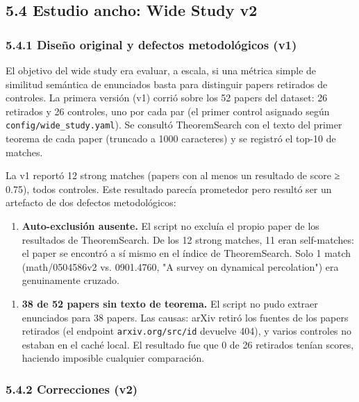 \documentclass[12pt,a4paper]{article}
\theoremstyle{remark}
\begin{document}
\subsection{5.4 Estudio ancho: Wide Study v2}

\subsubsection{5.4.1 Diseño original y defectos metodológicos (v1)}

El objetivo del wide study era evaluar, a escala, si una métrica simple de similitud semántica de enunciados basta para distinguir papers retirados de controles. La primera versión (v1) corrió sobre los 52 papers del dataset: 26 retirados y 26 controles, uno por cada par (el primer control asignado según \texttt{config/wide\_study.yaml}). Se consultó TheoremSearch con el texto del primer teorema de cada paper (truncado a 1000 caracteres) y se registró el top-10 de matches.


La v1 reportó 12 strong matches (papers con al menos un resultado de score ≥ 0.75), todos controles. Este resultado parecía prometedor pero resultó ser un artefacto de dos defectos metodológicos:

\begin{enumerate}
\item \textbf{Auto-exclusión ausente.} El script no excluía el propio paper de los resultados de TheoremSearch. De los 12 strong matches, 11 eran self-matches: el paper se encontró a sí mismo en el índice de TheoremSearch. Solo 1 match (math/0504586v2 vs. 0901.4760, "A survey on dynamical percolation") era genuinamente cruzado.
\end{enumerate}

\begin{enumerate}
\item \textbf{38 de 52 papers sin texto de teorema.} El script no pudo extraer enunciados para 38 papers. Las causas: arXiv retiró los fuentes de los papers retirados (el endpoint \texttt{arxiv.org/src/{id}} devuelve 404), y varios controles no estaban en el caché local. El resultado fue que 0 de 26 retirados tenían scores, haciendo imposible cualquier comparación.
\end{enumerate}


\subsubsection{5.4.2 Correcciones (v2)}
\end{document}
